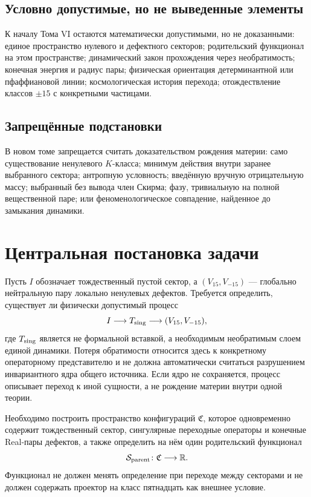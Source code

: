 \subsection{Условно допустимые, но не выведенные элементы}

К началу Тома VI остаются математически допустимыми, но не доказанными:
единое пространство нулевого и дефектного секторов; родительский
функционал на этом пространстве; динамический закон прохождения через
необратимость; конечная энергия и радиус пары; физическая ориентация
детерминантной или пфаффиановой линии; космологическая история перехода;
отождествление классов $\pm15$ с конкретными частицами.

\subsection{Запрещённые подстановки}

В новом томе запрещается считать доказательством рождения материи:
само существование ненулевого $K$-класса; минимум действия внутри заранее
выбранного сектора; антропную условность; введённую вручную отрицательную
массу; выбранный без вывода член Скирма; фазу, тривиальную на полной
вещественной паре; или феноменологическое совпадение, найденное до
замыкания динамики.

\section{Центральная постановка задачи}

Пусть $I$ обозначает тождественный пустой сектор, а
$(V_{15},V_{-15})$ --- глобально нейтральную пару локально ненулевых
дефектов. Требуется определить, существует ли физически допустимый процесс
\begin{equation}
 I
 \longrightarrow
 T_{\rm sing}
 \longrightarrow
 (V_{15},V_{-15}),
 \label{eq:v6-zero-singular-pair}
\end{equation}
где $T_{\rm sing}$ является не формальной вставкой, а необходимым
необратимым слоем единой динамики. Потеря обратимости относится здесь к
конкретному операторному представителю и не должна автоматически
считаться разрушением инвариантного ядра общего источника. Если ядро не
сохраняется, процесс описывает переход к иной сущности, а не рождение
материи внутри одной теории.

\begin{definition}
Необходимо построить пространство конфигураций $\mathfrak C$, которое
одновременно содержит тождественный сектор, сингулярные переходные
операторы и конечные Real-пары дефектов, а также определить на нём один
родительский функционал
\begin{equation}
 \mathcal S_{\rm parent}\colon\mathfrak C\longrightarrow\mathbb R.
\end{equation}
Функционал не должен менять определение при переходе между секторами и не
должен содержать проектор на класс пятнадцать как внешнее условие.
\end{definition}

